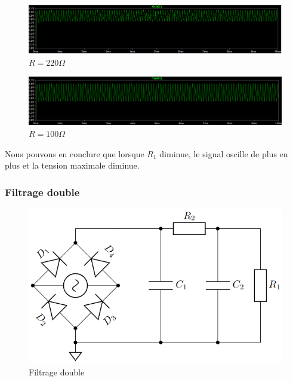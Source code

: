\begin{figure}[H]
    \begin{center}
    \includegraphics[scale=0.25]{images/LTSPICE/7.png}
    \caption{$R=220\Omega$}
    \end{center}
\end{figure}

\begin{figure}[H]
    \begin{center}
    \includegraphics[scale=0.25]{images/LTSPICE/8.png}
    \caption{$R=100\Omega$}
    \end{center}
\end{figure}

Nous pouvons en conclure que lorsque $R_1$ diminue, le signal oscille de plus en plus et la tension maximale diminue.


\subsubsection{Filtrage double}

\begin{figure}[H]
    \begin{center}
    \includegraphics[scale=0.5]{images/6.png}
    \caption{Filtrage double}
    \end{center}
\end{figure}


